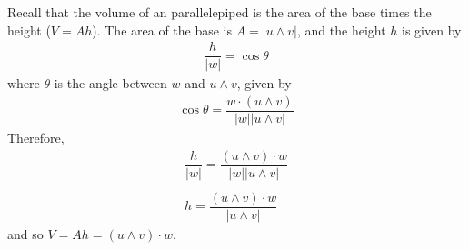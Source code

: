 \documentclass{article}
\begin{document}
	Recall that the volume of an parallelepiped is the area of the base times the height ($V = Ah$). The area of the base is $A = |u \wedge v|$, and the height $h$ is given by
	\begin{gather*}
		\dfrac{h}{|w|} = \cos \theta
	\end{gather*}
	where $\theta$ is the angle between $w$ and $u \wedge v$, given by
	\begin{gather*}
		\cos \theta = \dfrac{w \cdot (u \wedge v)}{|w||u \wedge v|}
	\end{gather*}
	Therefore,
	\begin{gather*}
		\dfrac{h}{|w|} = \dfrac{(u \wedge v) \cdot w}{|w||u \wedge v|} \\ \\
		h = \dfrac{(u \wedge v) \cdot w}{|u \wedge v|}
	\end{gather*}
	and so $V = Ah = (u \wedge v) \cdot w$.
	
\end{document}
